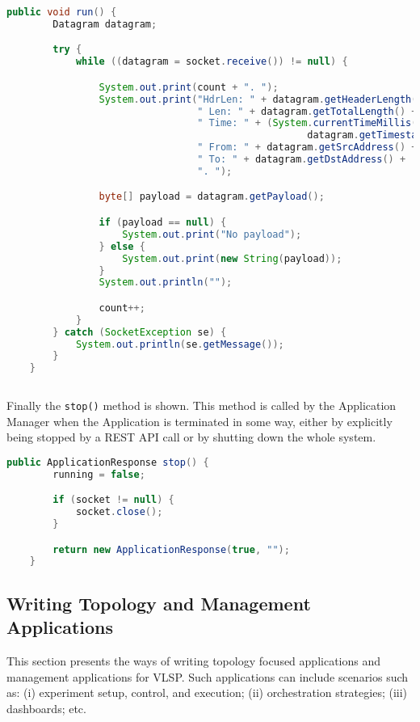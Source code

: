 \begin{lstlisting}[language=java,frame=single]
    public void run() {
        Datagram datagram;

        try {
            while ((datagram = socket.receive()) != null) {

                System.out.print(count + ". ");
                System.out.print("HdrLen: " + datagram.getHeaderLength() +
                                 " Len: " + datagram.getTotalLength() +
                                 " Time: " + (System.currentTimeMillis() - 
                                                    datagram.getTimestamp()) +
                                 " From: " + datagram.getSrcAddress() +
                                 " To: " + datagram.getDstAddress() +
                                 ". ");

                byte[] payload = datagram.getPayload();

                if (payload == null) {
                    System.out.print("No payload");
                } else {
                    System.out.print(new String(payload));
                }
                System.out.println("");

                count++;
            }
        } catch (SocketException se) {
            System.out.println(se.getMessage());
        }
    }
    
\end{lstlisting}

\noindent Finally the \texttt{stop()} method is shown.
This method is called by the Application Manager when the Application
is terminated in some way, either by explicitly being stopped by a
REST API call or by shutting down the whole system.

\begin{lstlisting}[language=java,frame=single]
    public ApplicationResponse stop() {
        running = false;

        if (socket != null) {
            socket.close();
        }

        return new ApplicationResponse(true, "");
    }
\end{lstlisting}

\subsection{Writing Topology and Management Applications}

This section presents the ways of writing topology focused
applications and management
applications for VLSP.  Such applications can include scenarios such
as: (i) experiment setup, control, and execution; (ii) orchestration
strategies; (iii) dashboards; etc.




